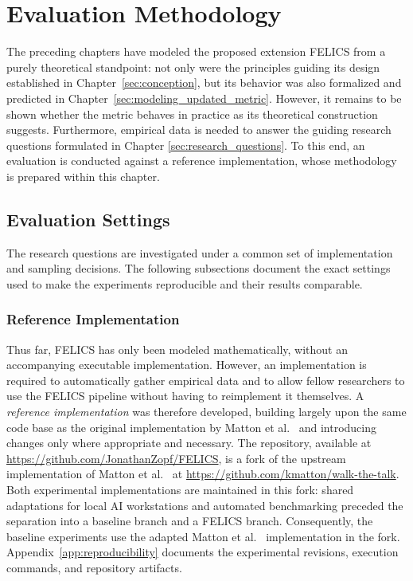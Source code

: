 \chapter{Evaluation Methodology}
\label{ch:evaluation_methodology}
The preceding chapters have modeled the proposed extension FELICS from a purely theoretical standpoint: not only were the principles guiding its design established in Chapter~\ref{sec:conception}, but its behavior was also formalized and predicted in Chapter~\ref{sec:modeling_updated_metric}. However, it remains to be shown whether the metric behaves in practice as its theoretical construction suggests. Furthermore, empirical data is needed to answer the guiding research questions formulated in Chapter \ref{sec:research_questions}. To this end, an evaluation is conducted against a reference implementation, whose methodology is prepared within this chapter.

\section{Evaluation Settings}
The research questions are investigated under a common set of implementation and sampling decisions. The following subsections document the exact settings used to make the experiments reproducible and their results comparable.

\subsection{Reference Implementation}
\label{sec:reference_implementation}
Thus far, FELICS has only been modeled mathematically, without an accompanying executable implementation. However, an implementation is required to automatically gather empirical data and to allow fellow researchers to use the FELICS pipeline without having to reimplement it themselves. A \emph{reference implementation} was therefore developed, building largely upon the same code base as the original implementation by Matton et al.~\cite{mattonWalkTalkMeasuring2024} and introducing changes only where appropriate and necessary. The repository, available at \url{https://github.com/JonathanZopf/FELICS}, is a fork of the upstream implementation of Matton et al.~\cite{mattonWalkTalkMeasuring2024} at \url{https://github.com/kmatton/walk-the-talk}. Both experimental implementations are maintained in this fork: shared adaptations for local AI workstations and automated benchmarking preceded the separation into a baseline branch and a FELICS branch. Consequently, the baseline experiments use the adapted Matton et al.~\cite{mattonWalkTalkMeasuring2024} implementation in the fork. Appendix~\ref{app:reproducibility} documents the experimental revisions, execution commands, and repository artifacts.

